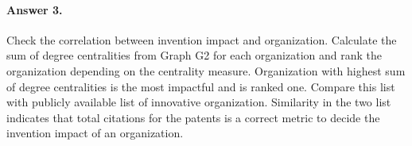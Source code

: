 \paragraph{Answer 3.} Check the correlation between invention impact and organization.
Calculate the sum of degree centralities from Graph G2 for each organization and rank the 
organization depending on the centrality measure. Organization with highest sum of degree
centralities is the most impactful and is ranked one. Compare this list with publicly available
list of innovative organization. Similarity in the two list indicates that total citations for the patents
is a correct metric to decide the invention impact of an organization.


